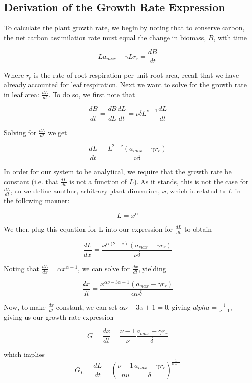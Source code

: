 \documentclass{article}
\begin{document}
  \subsection{Derivation of the Growth Rate Expression} \label{G derivation}

  To calculate the plant growth rate, we begin by noting
  that to conserve carbon, the net carbon assimilation rate must
  equal the change in biomass, $B$, with time

  $$ L a_{max} - \gamma L r_{r} = \frac{dB}{dt}$$

  Where $r_{r}$ is the rate of root respiration per unit root area, recall that
  we have already accounted for leaf respiration. Next we want to solve for the
  growth rate in leaf area: $\frac{dL}{dt}$. To do so, we first note that

  $$ \frac{dB}{dt} = \frac{dB}{dL} \frac{dL}{dt} = \nu \delta L^{\nu - 1} \frac{dL}{dt} $$

  Solving for $\frac{dL}{dt}$ we get

  $$ \frac{dL}{dt} = \frac{L^{2 - \nu} ( a_{max} - \gamma r_{r})}{\nu \delta} $$

  In order for our system to be analytical, we require that the growth rate be
  constant (i.e. that $\frac{dL}{dt}$ is not a function of $L$). As it stands, this is not the
  case for $\frac{dL}{dt}$, so we define another, arbitrary plant dimension,
  $x$, which is related to $L$ in the following manner:

  $$ L = x^{\alpha} $$

  We then plug this equation for L into our expression for $\frac{dL}{dt}$ to
  obtain

  $$ \frac{dL}{dx} = \frac{x^{\alpha(2 - \nu)}(a_{max} - \gamma r_{r})}{\nu \delta} $$

  Noting that $\frac{dL}{dx} = \alpha x^{\alpha - 1}$, we can solve for
  $\frac{dx}{dt}$, yielding

  $$ \frac{dx}{dt} = \frac{x^{\alpha \nu - 3\alpha + 1}(a_{max} - \gamma r_{r})}{\alpha \nu \delta} $$

  Now, to make $\frac{dx}{dt}$ constant, we can set
  $\alpha \nu - 3 \alpha + 1 = 0$, giving $alpha = \frac{1}{\nu - 1}$, giving us
  our growth rate expression

  \begin{equation} \label{eq:Gx}
    G = \frac{dx}{dt} = \frac{\nu - 1}{\nu}\frac{a_{max} - \gamma r_{r}}{\delta}
  \end{equation}

  which implies
  \begin{equation} \label{eq:Gl}
    G_{L} = \frac{dL}{dt} = \left( \frac{\nu - 1}{nu} \frac{a_{max} - \gamma r_{r}}{\delta} \right)^{\frac{1}{\nu - 1}}
  \end{equation}
\end{document}
